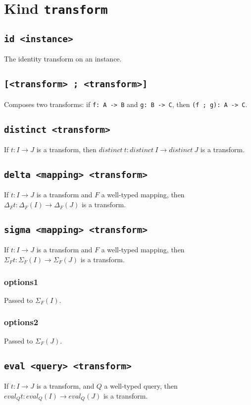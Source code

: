 \documentclass[10pt]{book}
\begin{document}
\chapter{Kind {\tt transform}}
\section{{\tt id <instance>}}
The identity transform on an instance.
\section{{\tt [<transform> ; <transform>]}}
Composes two transforms: if {\tt f: A -> B} and {\tt g: B -> C}, then {\tt (f ; g): A -> C}.

\section{{\tt distinct <transform>}}
If $t : I \to J$ is a transform, then $distinct \ t : distinct \ I \to distinct \ J$ is a transform.

\section{{\tt delta <mapping> <transform>}}
If $t : I \to J$ is a transform and $F$ a well-typed mapping, then $\Delta_Ft : \Delta_F(I) \to \Delta_F(J)$ is a transform.

\section{{\tt sigma <mapping> <transform>}}
If $t : I \to J$ is a transform and $F$ a well-typed mapping, then $\Sigma_Ft : \Sigma_F(I) \to \Sigma_F(J)$ is a transform.
\subsection{options1}
Passed to $\Sigma_F(I)$.
\subsection{options2}
Passed to $\Sigma_F(J)$.

\section{{\tt eval <query> <transform>}}
If $t : I \to J$ is a transform, and $Q$ a well-typed query, then $eval_Qt : eval_Q(I) \to eval_Q(J)$ is a transform.
\end{document}
